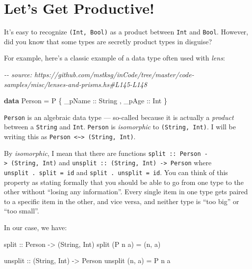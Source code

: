 \documentclass[]{article}
\newenvironment{Shaded}{}{}
\newcommand{\CommentTok}[1]{\textcolor[rgb]{0.38,0.63,0.69}{\textit{#1}}}
\newcommand{\DataTypeTok}[1]{\textcolor[rgb]{0.56,0.13,0.00}{#1}}
\newcommand{\KeywordTok}[1]{\textcolor[rgb]{0.00,0.44,0.13}{\textbf{#1}}}
\newcommand{\NormalTok}[1]{#1}
\newcommand{\OtherTok}[1]{\textcolor[rgb]{0.00,0.44,0.13}{#1}}
\begin{document}
\hypertarget{lets-get-productive}{%
\section{Let's Get Productive!}\label{lets-get-productive}}

It's easy to recognize \texttt{(Int,\ Bool)} as a product between \texttt{Int}
and \texttt{Bool}. However, did you know that some types are secretly product
types in disguise?

For example, here's a classic example of a data type often used with
\emph{lens}:

\begin{Shaded}
\begin{Highlighting}[]
\CommentTok{{-}{-} source: https://github.com/mstksg/inCode/tree/master/code{-}samples/misc/lenses{-}and{-}prisms.hs\#L145{-}L148}

\KeywordTok{data} \DataTypeTok{Person} \OtherTok{=} \DataTypeTok{P}
\NormalTok{    \{}\OtherTok{ \_pName ::} \DataTypeTok{String}
\NormalTok{    ,}\OtherTok{ \_pAge  ::} \DataTypeTok{Int}
\NormalTok{    \}}
\end{Highlighting}
\end{Shaded}

\texttt{Person} is an algebraic data type --- so-called because it is actually a
\emph{product} between a \texttt{String} and \texttt{Int}. \texttt{Person} is
\emph{isomorphic} to \texttt{(String,\ Int)}. I will be writing this as
\texttt{Person\ \textless{}\textasciitilde{}\textgreater{}\ (String,\ Int)}.

By \emph{isomorphic}, I mean that there are functions
\texttt{split\ ::\ Person\ -\textgreater{}\ (String,\ Int)} and
\texttt{unsplit\ ::\ (String,\ Int)\ -\textgreater{}\ Person} where
\texttt{unsplit\ .\ split\ =\ id} and \texttt{split\ .\ unsplit\ =\ id}. You can
think of this property as stating formally that you should be able to go from
one type to the other without ``losing any information''. Every single item in
one type gets paired to a specific item in the other, and vice versa, and
neither type is ``too big'' or ``too small''.

In our case, we have:

\begin{Shaded}
\begin{Highlighting}[]
\OtherTok{split ::} \DataTypeTok{Person} \OtherTok{{-}>}\NormalTok{ (}\DataTypeTok{String}\NormalTok{, }\DataTypeTok{Int}\NormalTok{)}
\NormalTok{split (}\DataTypeTok{P}\NormalTok{ n a) }\OtherTok{=}\NormalTok{ (n, a)}

\OtherTok{unsplit ::}\NormalTok{ (}\DataTypeTok{String}\NormalTok{, }\DataTypeTok{Int}\NormalTok{) }\OtherTok{{-}>} \DataTypeTok{Person}
\NormalTok{unsplit (n, a) }\OtherTok{=} \DataTypeTok{P}\NormalTok{ n a}
\end{Highlighting}
\end{Shaded}
\end{document}
